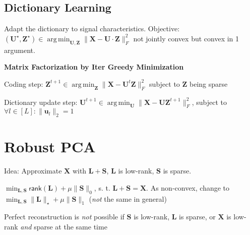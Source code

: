 \documentclass[a4paper, 11pt, landscape]{article}
\DeclareMathOperator*{\argmin}{arg\,min}
\begin{document}
\begin{multicols*}{3}

    \subsection{Dictionary Learning}
    Adapt the dictionary to signal characteristics. Objective: $(\mathbf{U}^\star, \mathbf{Z}^\star) \in \argmin_\mathbf{U,Z} \| \mathbf{X} - \mathbf{U} \cdot \mathbf{Z} \|_F^2$ not jointly convex but convex in 1 argument.

    \textbf{Matrix Factorization by Iter Greedy Minimization}
    \begin{inparaenum}
    \item Coding step: $\mathbf{Z}^{t+1} \in \argmin_\mathbf{Z} \| \mathbf{X} - \mathbf{U}^t \mathbf{Z} \|_F^2$ subject to $\mathbf{Z}$ being sparse
    \item Dictionary update step: $\mathbf{U}^{t+1} \in \argmin_\mathbf{U} \| \mathbf{X} - \mathbf{UZ}^{t+1} \|_F^2$, subject to $\forall l\in [L]:\|\mathbf{u}_l\|_2 = 1$
    \end{inparaenum}

    \section{Robust PCA}
    \begin{compactitem}
    \item Idea: Approximate $\mathbf{X}$ with $\mathbf{L} + \mathbf{S}$, $\mathbf{L}$ is low-rank, $\mathbf{S}$ is sparse.
    \item $\min_{\mathbf{L},\mathbf{S}}\mathsf{rank}(\mathbf{L}) + \mu \lVert \mathbf{S}\rVert_0$, s. t. $\mathbf{L} + \mathbf{S} = \mathbf{X}$. 
        As non-convex, change to $\min_{\mathbf{L},\mathbf{S}} \|\mathbf{L}\|_\star + \mu \lVert\mathbf{S}\rVert_1$ (\emph{not} the same in general)
    \item Perfect reconstruction is \emph{not} possible if $\mathbf{S}$ is low-rank, $\mathbf{L}$ is sparse, or $\mathbf{X}$ is low-rank \textit{and} sparse at the same time
    \end{compactitem}


\end{multicols*}
\end{document}
